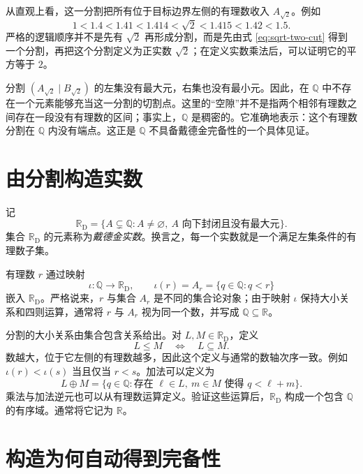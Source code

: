 \documentclass[UTF8,12pt,a4paper,fontset=fandol]{ctexbook}
\begin{document}
从直观上看，这一分割把所有位于目标边界左侧的有理数收入 $A_{\sqrt{2}}$。例如
\[
  1<1.4<1.41<1.414<\sqrt{2}<1.415<1.42<1.5.
\]
严格的逻辑顺序并不是先有 $\sqrt{2}$ 再形成分割，而是先由式 \eqref{eq:sqrt-two-cut} 得到一个分割，再把这个分割定义为正实数 $\sqrt{2}$；在定义实数乘法后，可以证明它的平方等于 $2$。

\begin{remark}[有理数域中的空隙]
分割 $(A_{\sqrt{2}}\mid B_{\sqrt{2}})$ 的左集没有最大元，右集也没有最小元。因此，在 $\mathbb{Q}$ 中不存在一个元素能够充当这一分割的切割点。这里的“空隙”并不是指两个相邻有理数之间存在一段没有有理数的区间；事实上，$\mathbb{Q}$ 是稠密的。它准确地表示：这个有理数分割在 $\mathbb{Q}$ 内没有端点。这正是 $\mathbb{Q}$ 不具备戴德金完备性的一个具体见证。
\end{remark}

\section{由分割构造实数}

\begin{definition}[戴德金实数]
记
\[
  \mathbb{R}_{\mathrm D}
  =\bigl\{A\subsetneq\mathbb{Q}:A\ne\varnothing,
  \ A\text{ 向下封闭且没有最大元}\bigr\}.
\]
集合 $\mathbb{R}_{\mathrm D}$ 的元素称为\emph{戴德金实数}。换言之，每一个实数就是一个满足左集条件的有理数子集。
\end{definition}

有理数 $r$ 通过映射
\[
  \iota:\mathbb{Q}\longrightarrow\mathbb{R}_{\mathrm D},
  \qquad
  \iota(r)=A_r=\{q\in\mathbb{Q}:q<r\}
\]
嵌入 $\mathbb{R}_{\mathrm D}$。严格说来，$r$ 与集合 $A_r$ 是不同的集合论对象；由于映射 $\iota$ 保持大小关系和四则运算，通常将 $r$ 与 $A_r$ 视为同一个数，并写成 $\mathbb{Q}\subseteq\mathbb{R}$。

分割的大小关系由集合包含关系给出。对 $L,M\in\mathbb{R}_{\mathrm D}$，定义
\[
  L\le M\quad\Longleftrightarrow\quad L\subseteq M.
\]
数越大，位于它左侧的有理数越多，因此这个定义与通常的数轴次序一致。例如 $\iota(r)<\iota(s)$ 当且仅当 $r<s$。加法可以定义为
\[
  L\oplus M
  =\{q\in\mathbb{Q}:\text{存在 }\ell\in L,\ m\in M
  \text{ 使得 }q<\ell+m\}.
\]
乘法与加法逆元也可以从有理数运算定义。验证这些运算后，$\mathbb{R}_{\mathrm D}$ 构成一个包含 $\mathbb{Q}$ 的有序域。通常将它记为 $\mathbb{R}$。

\section{构造为何自动得到完备性}
\end{document}
